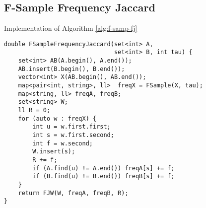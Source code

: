 \subsection*{F-Sample Frequency Jaccard}

Implementation of Algorithm \ref{alg:f-samp-fj}
\begin{lstlisting}
double FSampleFrequencyJaccard(set<int> A, 
                               set<int> B, int tau) {
	set<int> AB(A.begin(), A.end());
	AB.insert(B.begin(), B.end());
	vector<int> X(AB.begin(), AB.end());
	map<pair<int, string>, ll>  freqX = FSample(X, tau);
	map<string, ll> freqA, freqB;
	set<string> W;
	ll R = 0;
	for (auto w : freqX) {
		int u = w.first.first;
		int s = w.first.second;
		int f = w.second;
		W.insert(s);
		R += f;
		if (A.find(u) != A.end()) freqA[s] += f;
		if (B.find(u) != B.end()) freqB[s] += f;
	}
	return FJW(W, freqA, freqB, R);
}
\end{lstlisting}


\noindent

\clearpage